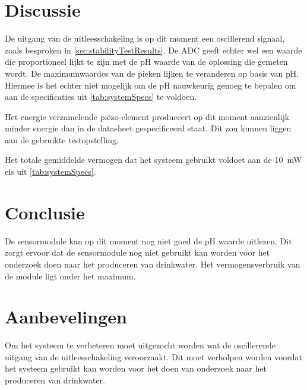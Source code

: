 \section{Discussie}
De uitgang van de uitleesschakeling is op dit moment een oscillerend signaal, zoals besproken in \cref{sec:stabilityTestResults}. De ADC geeft echter wel een waarde die proportioneel lijkt te zijn met de pH waarde van de oplossing die gemeten wordt.
De maximumwaardes van de pieken lijken te veranderen op basis van pH. Hiermee is het echter niet mogelijk om de pH nauwkeurig genoeg te bepalen om aan de specificaties uit \cref{tab:systemSpecs} te voldoen.

Het energie verzamelende piëzo-element produceert op dit moment aanzienlijk minder energie dan in de datasheet gespecificeerd staat. Dit zou kunnen liggen aan de gebruikte testopstelling.

Het totale gemiddelde vermogen dat het systeem gebruikt voldoet aan de \qty{10}{\milli\watt} eis uit \cref{tab:systemSpecs}.

\newpage
\section{Conclusie}
De sensormodule kan op dit moment nog niet goed de pH waarde uitlezen. Dit zorgt ervoor dat de sensormodule nog niet gebruikt kan worden voor het onderzoek doen naar het produceren van drinkwater. Het vermogensverbruik van de module ligt onder het maximum.


\newpage
\section{Aanbevelingen}
Om het systeem te verbeteren moet uitgezocht worden wat de oscillerende uitgang van de uitleesschakeling veroorzaakt. Dit moet verholpen worden voordat het systeem gebruikt kan worden voor het doen van onderzoek naar het produceren van drinkwater.


